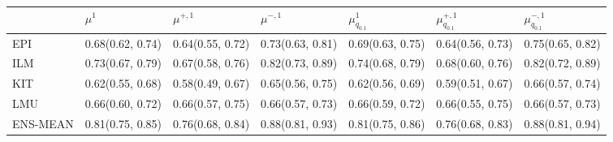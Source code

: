 \begin{tabular}{l p{} p{} p{} p{} p{} p{}}
\toprule
 & $\mu^{1}$ & $\mu^{+, 1}$ & $\mu^{-, 1}$ & $\mu^{1}_{q_{0.1}}$ & $\mu^{+, 1}_{q_{0.1}}$ & $\mu^{-, 1}_{q_{0.1}}$ \\
\midrule
EPI & {0.68\newline(0.62, 0.74)} & {0.64\newline(0.55, 0.72)} & {0.73\newline(0.63, 0.81)} & {0.69\newline(0.63, 0.75)} & {0.64\newline(0.56, 0.73)} & {0.75\newline(0.65, 0.82)} \\
ILM & {0.73\newline(0.67, 0.79)} & {0.67\newline(0.58, 0.76)} & {0.82\newline(0.73, 0.89)} & {0.74\newline(0.68, 0.79)} & {0.68\newline(0.60, 0.76)} & {0.82\newline(0.72, 0.89)} \\
KIT & {0.62\newline(0.55, 0.68)} & {0.58\newline(0.49, 0.67)} & {0.65\newline(0.56, 0.75)} & {0.62\newline(0.56, 0.69)} & {0.59\newline(0.51, 0.67)} & {0.66\newline(0.57, 0.74)} \\
LMU & {0.66\newline(0.60, 0.72)} & {0.66\newline(0.57, 0.75)} & {0.66\newline(0.57, 0.73)} & {0.66\newline(0.59, 0.72)} & {0.66\newline(0.55, 0.75)} & {0.66\newline(0.57, 0.73)} \\
ENS-MEAN & {0.81\newline(0.75, 0.85)} & {0.76\newline(0.68, 0.84)} & {0.88\newline(0.81, 0.93)} & {0.81\newline(0.75, 0.86)} & {0.76\newline(0.68, 0.83)} & {0.88\newline(0.81, 0.94)} \\

\end{tabular}
